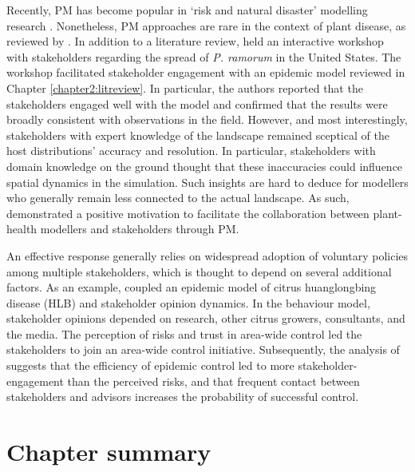 Recently, PM has become popular in `risk and natural disaster' modelling research \cite{hamalainen2020leadership, ravera2020participatory, hedelin2017participatory}. Nonetheless, PM approaches are rare in the context of plant disease, as reviewed by \cite{gaydos2019forecasting}.
In addition to a literature review, \cite{gaydos2019forecasting} held an interactive workshop with stakeholders regarding the spread of \textit{P. ramorum} in the United States. The workshop facilitated stakeholder engagement with an epidemic model \cite{tonini2017tangible}\textemdash reviewed in Chapter \ref{chapter2:litreview}. In particular, the authors reported that the stakeholders engaged well with the model and confirmed that the results were broadly consistent with observations in the field. However, and most interestingly, stakeholders with expert knowledge of the landscape remained sceptical of the host distributions' accuracy and resolution. In particular, stakeholders with domain knowledge on the ground thought that these inaccuracies could influence spatial dynamics in the simulation. Such insights are hard to deduce for modellers who generally remain less connected to the actual landscape. As such, \cite{tonini2017tangible} demonstrated a positive motivation to facilitate the collaboration 
between plant-health modellers and stakeholders through PM.

An effective response generally relies on widespread adoption of voluntary policies among multiple stakeholders, which is thought to depend on several additional factors. As an example, \cite{milne2020makes} coupled an epidemic model of citrus huanglongbing disease (HLB) and stakeholder opinion dynamics. In the behaviour model, stakeholder
opinions depended on research, other citrus growers, consultants, and the media. The perception of risks and trust in area-wide control led the stakeholders to join an area-wide control initiative. Subsequently, the analysis of \cite{milne2020makes} suggests that the efficiency of epidemic control led to more stakeholder-engagement than the perceived risks, and that frequent contact between stakeholders and advisors increases the probability of successful control.

\newpage

\section{Chapter summary}

